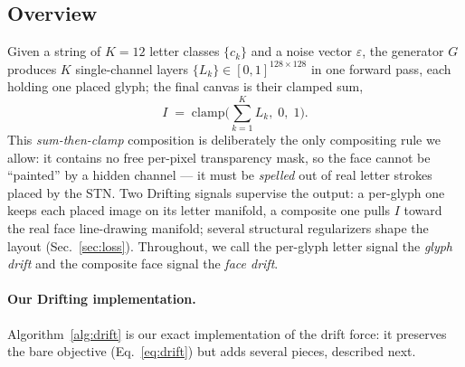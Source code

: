 \documentclass{article}
\begin{document}
\subsection{Overview}
Given a string of $K{=}12$ letter classes $\{c_k\}$ and a noise vector $\varepsilon$, the generator
$G$ produces $K$ single-channel layers $\{L_k\}\in[0,1]^{128\times128}$ in one forward pass, each
holding one placed glyph; the final canvas is their clamped sum,
\begin{equation}
\label{eq:compose}
   I \;=\; \mathrm{clamp}\!\Big(\textstyle\sum_{k=1}^{K} L_k,\; 0,\; 1\Big).
\end{equation}
This \emph{sum-then-clamp} composition is deliberately the only compositing rule we allow: it contains
no free per-pixel transparency mask, so the face cannot be ``painted'' by a hidden channel --- it must
be \emph{spelled} out of real letter strokes placed by the STN. Two Drifting signals supervise the
output: a per-glyph one keeps each placed image on its letter manifold, a composite one pulls $I$
toward the real face line-drawing manifold; several structural regularizers shape the layout
(Sec.~\ref{sec:loss}). Throughout, we call the per-glyph letter signal the \emph{glyph drift} and the
composite face signal the \emph{face drift}.

\paragraph{Our Drifting implementation.}
Algorithm~\ref{alg:drift} is our exact implementation of the drift force: it preserves the bare
objective (Eq.~\ref{eq:drift}) but adds several pieces, described next.
\end{document}
